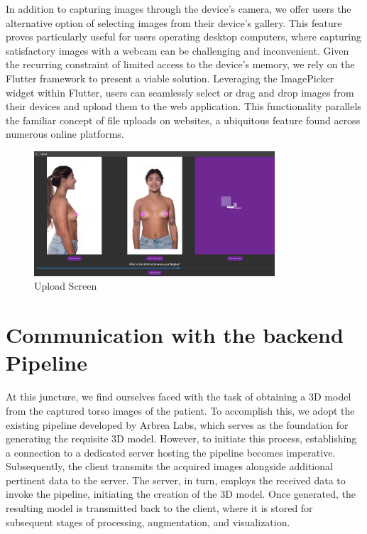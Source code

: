 In addition to capturing images through the device's camera, we offer users the alternative option of selecting images from their device's gallery. This feature proves particularly useful 
for users operating desktop computers, where capturing satisfactory images with a webcam can be challenging and inconvenient. Given the recurring constraint of limited access to the device's memory, 
we rely on the Flutter framework to present a viable solution. Leveraging the ImagePicker widget within Flutter, users can seamlessly select or drag and drop images from their devices 
and upload them to the web application. This functionality parallels the familiar concept of file uploads on websites, a ubiquitous feature found across numerous online platforms. 

\begin{figure}[H]
    \centering
    \includegraphics[width = 0.8\textwidth]{figures/upload_drag_and_drop.png}
    \caption{Upload Screen}
    \label{fig:deag_and_drop}
\end{figure}

\section{Communication with the backend Pipeline}

At this juncture, we find ourselves faced with the task of obtaining a 3D model from the captured torso images of the patient. To accomplish this, we adopt the existing pipeline developed by Arbrea Labs, 
which serves as the foundation for generating the requisite 3D model. However, to initiate this process, establishing a connection to a dedicated server hosting the pipeline becomes imperative. 
Subsequently, the client transmits the acquired images alongside additional pertinent data to the server. The server, in turn, employs the received data to invoke the pipeline, 
initiating the creation of the 3D model. Once generated, the resulting model is transmitted back to the client, where it is stored for subsequent stages of processing, augmentation, and visualization.

